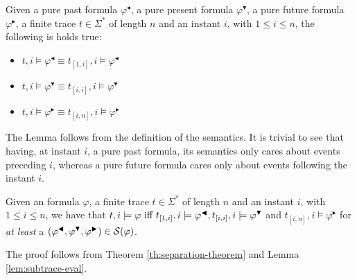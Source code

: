 \begin{lemma}\citep{cecconi2018interestingness}\label{lem:subtrace-eval}
Given a pure past formula $\varphi^\blacktriangleleft$, a pure present formula $\varphi^\blacktriangledown$, a pure future formula $\varphi^\blacktriangleright$, a finite trace $t \in \Sigma^*$ of length $n$ and an instant $i$, with $1 \le i \le n$, the following is holds true:
\begin{itemize}
\item $t,i \models \varphi^\blacktriangleleft \equiv t_{[1,i]}, i \models \varphi^\blacktriangleleft$
\item $t,i \models \varphi^\blacktriangledown \equiv t_{[i,i]}, i \models \varphi^\blacktriangledown$
\item $t,i \models \varphi^\blacktriangleright \equiv t_{[i,n]}, i \models \varphi^\blacktriangleright$
\end{itemize}
\end{lemma}
The Lemma follows from the definition of the \LTLp semantics. It is trivial to see that having, at instant $i$, a pure past formula, its semantics only cares about events preceding $i$, whereas a pure future formula cares only about events following the instant $i$.
\begin{theorem}\citep{cecconi2018interestingness}\label{th:sepformulas-eval}
Given an \LTLp formula $\varphi$, a finite trace $t \in \Sigma^*$ of length $n$ and an instant $i$, with $1 \le i \le n$, we have that $t,i \models \varphi \tiff t_{[1,i]}, i \models \varphi^\blacktriangleleft, t_{[i,i]}, i \models \varphi^\blacktriangledown$ and $t_{[i,n]}, i \models \varphi^\blacktriangleright$ for \emph{at least} a $(\varphi^{\blacktriangleleft},\varphi^{\blacktriangledown},\varphi^{\blacktriangleright}) \in \S(\varphi)$.
\end{theorem}
The proof follows from Theorem \ref{th:separation-theorem} and Lemma \ref{lem:subtrace-eval}.

